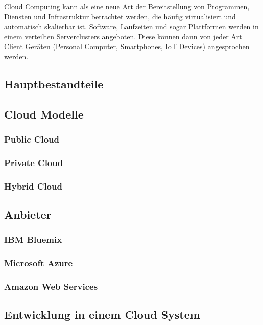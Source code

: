 
Cloud Computing kann als eine neue Art der Bereitstellung von Programmen, Diensten und Infrastruktur betrachtet werden, die häufig virtualisiert und automatisch skalierbar ist.
Software, Laufzeiten und sogar Plattformen werden in einem verteilten Serverclusters angeboten. Diese können dann von jeder Art  Client Geräten (Personal Computer, Smartphones, \ac{IoT} Devices) angesprochen werden.

\subsection{Hauptbestandteile}

\subsection{Cloud Modelle}

\subsubsection{Public Cloud}

\subsubsection{Private Cloud}

\subsubsection{Hybrid Cloud}

\subsection{Anbieter}
\subsubsection{IBM Bluemix}
\subsubsection{Microsoft Azure}
\subsubsection{Amazon Web Services}

\subsection{Entwicklung in einem Cloud System}